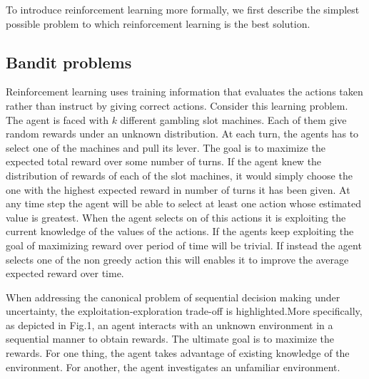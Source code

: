 To introduce reinforcement learning more formally,
we first describe the simplest possible problem 
to which reinforcement learning is the best solution.

\subsection{Bandit problems}
Reinforcement learning  uses training information that evaluates 
the actions taken rather than instruct by giving correct actions.
Consider this learning problem.
The agent is faced with $k$ different gambling slot machines.
Each of them give random rewards under an unknown distribution.
At each turn, the agents has to select one of the machines and pull its lever.
The goal is to maximize the expected total reward over some number of turns.
If the agent knew the distribution of rewards of each of the slot machines, 
it would simply choose the one with the highest expected reward in number of turns 
it has been given.
At any time step the agent will be able to select at least one action whose estimated value is greatest.
When the agent selects on of this actions it is exploiting the current knowledge of the
values of the actions.
If the agents keep exploiting the goal of maximizing reward over period of time will be trivial.
If instead the agent selects one of the non greedy action this will enables it to improve the average expected reward over time.
 
When addressing the canonical problem of sequential decision making under uncertainty,
the exploitation-exploration trade-off is highlighted.More specifically,
as depicted in Fig.1, an agent interacts with an unknown environment in a sequential manner to obtain rewards.
The ultimate goal is to maximize the rewards.
For one thing, the agent takes advantage of existing knowledge of the environment.
For another, the agent investigates an unfamiliar environment.

